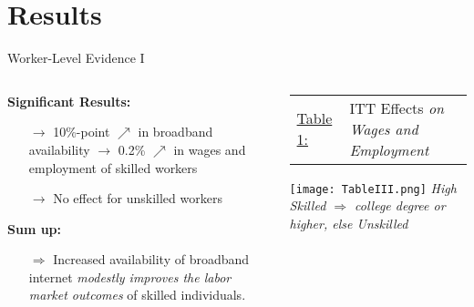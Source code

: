 \documentclass[compress, aspectratio=169, xcolor=dvipsnames]{beamer}
\begin{document}
\section{Results}




\begin{frame}{Worker-Level Evidence I}

\begin{columns}
	
\begin{column}{0.5\textwidth}
\textbf{Significant Results:}
\begin{itemize}
	\item[$\rightarrow$] 10\%-point $\nearrow$ in broadband availability $\rightarrow$ 0.2\% $\nearrow$ in wages and employment of skilled workers
	\item[$\rightarrow$] No effect for unskilled workers
\end{itemize}
\vspace{5pt}
\textbf{Sum up:}
\begin{itemize}
	\item[$\Rightarrow$] Increased availability of broadband internet \textit{modestly improves the labor market outcomes} of skilled individuals.
\end{itemize}


\end{column}

\begin{column}{0.45\textwidth}
	
	\scriptsize{
	\begin{tabular}{l p{6cm}}
 	\underline{Table 1:} & ITT Effects \newline \textit{on Wages and Employment}
 	\end{tabular}}
 	\centering
    \texttt{[image: TableIII.png]}\qquad
    \tiny
    \textit{High Skilled $\Rightarrow$ college degree or higher, else Unskilled}
    
\end{column}
	
\end{columns}
	
\end{frame}
\end{document}
